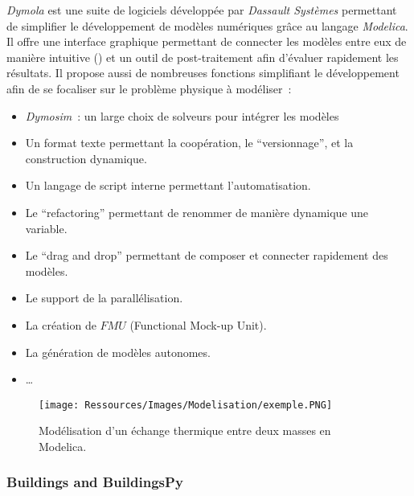 \textit{Dymola} est une suite de logiciels développée par \textit{Dassault Systèmes}
permettant de simplifier le développement de modèles numériques grâce au langage
\textit{Modelica}. Il offre une interface graphique permettant de connecter les modèles
entre eux de manière intuitive () et un outil de
post-traitement afin d’évaluer rapidement les résultats. Il propose aussi de nombreuses fonctions
simplifiant le développement afin de se focaliser sur le problème physique à modéliser~:
\begin{itemize}
    \item \textit{Dymosim}~: un large choix de solveurs pour intégrer les modèles
    \item Un format texte permettant la coopération, le \enquote{versionnage}, et la construction dynamique.
    \item Un langage de script interne permettant l’automatisation.
    \item Le \enquote{refactoring} permettant de renommer de manière dynamique une variable.
    \item Le \enquote{drag and drop} permettant de composer et connecter rapidement des modèles.
    \item Le support de la parallélisation.
    \item La création de $FMU$ (Functional Mock-up Unit).
    \item La génération de modèles autonomes.
    \item \dots
\end{itemize}

\begin{figure}
    \centering
    \texttt{[image: Ressources/Images/Modelisation/exemple.PNG]}
    \caption{Modélisation d’un échange thermique entre deux masses en Modelica.}
    \label{fig:exemple_modelica}
\end{figure}


\subsubsection{Buildings and BuildingsPy} %
\label{ssub:buildings_and_buildingspy}

